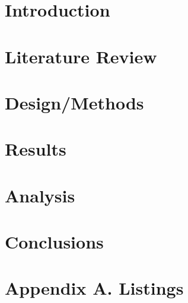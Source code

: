 \documentclass[a4paper,12pt,oneside]{book}
\begin{document}

\frontmatter

\clearpage

\clearpage





\mainmatter
\setcounter{page}{1}
\chapter{Introduction}

\chapter{Literature Review}

\chapter{Design/Methods}

\chapter{Results}

\chapter{Analysis}

\chapter{Conclusions}


\backmatter


\nocite{*}


\appendix
\chapter{Appendix A. Listings}


%

%


\end{document}
